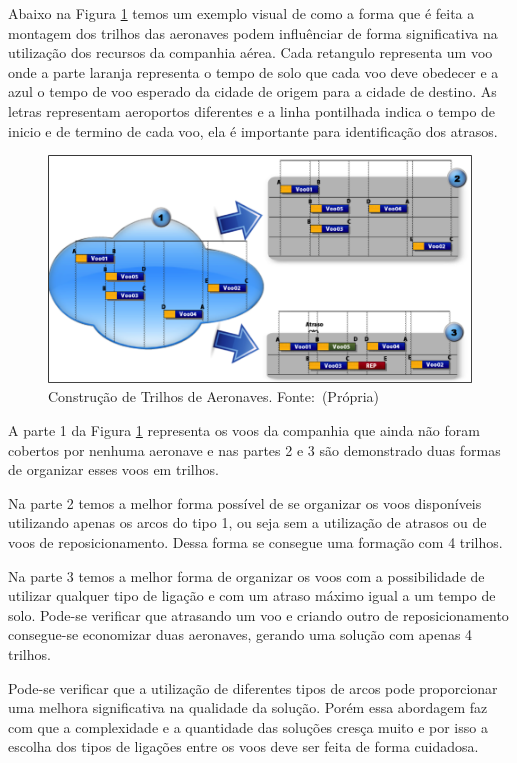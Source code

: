 Abaixo na Figura \ref{fig:arpexample} temos um exemplo visual de como a forma
que é feita a montagem dos trilhos das aeronaves podem influênciar de forma
significativa na utilização dos recursos da companhia aérea. Cada
retangulo representa um voo onde a parte laranja representa o tempo de solo que
cada voo deve obedecer e a azul o tempo de voo esperado da cidade de origem para
a cidade de destino. As letras representam aeroportos diferentes e a linha
pontilhada indica o tempo de inicio e de termino de cada voo, ela é importante
para identificação dos atrasos.

\begin{figure}[ht]
	\caption{Construção de Trilhos de Aeronaves. \mbox{Fonte: (Própria)}}
	\label{fig:arpexample}
	\includegraphics[scale=0.6]{./img/arpexample}
	
\end{figure}

A parte 1 da Figura \ref{fig:arpexample} representa os voos da companhia que
ainda não foram cobertos por nenhuma aeronave e nas partes 2 e 3 são
demonstrado duas formas de organizar esses voos em trilhos.

Na parte 2 temos a melhor forma possível de se organizar os voos disponíveis
utilizando apenas os arcos do tipo 1, ou seja sem a utilização de atrasos ou de
voos de reposicionamento. Dessa forma se consegue uma formação com 4 trilhos.

Na parte 3 temos a melhor forma de organizar os voos com a possibilidade de
utilizar qualquer tipo de ligação e com um atraso máximo igual a um tempo de
solo. Pode-se verificar que atrasando um voo e criando outro de
reposicionamento consegue-se economizar duas aeronaves, gerando uma solução com
apenas 4 trilhos.

Pode-se verificar que a utilização de diferentes tipos de arcos pode
proporcionar uma melhora significativa na qualidade da solução. Porém essa
abordagem faz com que a complexidade e a quantidade das soluções
cresça muito e por isso a escolha dos tipos de ligações entre os voos
deve ser feita de forma cuidadosa.


